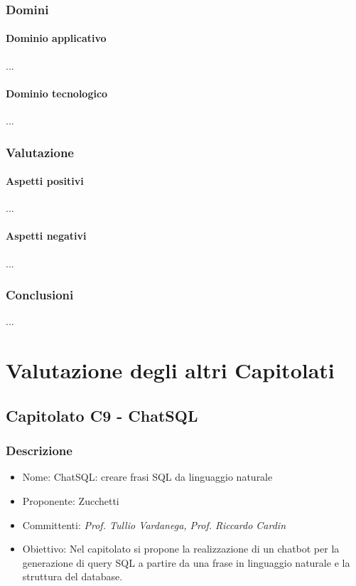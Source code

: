 \documentclass[italian,12pt]{article} %
\begin{document}
\subsubsection{Domini}
\paragraph{Dominio applicativo}
...
\paragraph{Dominio tecnologico}
...

\subsubsection{Valutazione}
\paragraph{Aspetti positivi}
...
\paragraph{Aspetti negativi}
...

\subsubsection{Conclusioni}
...



\section{Valutazione degli altri Capitolati}

\subsection{Capitolato C9 - ChatSQL}

\subsubsection{Descrizione}
\begin{itemize}
	\item Nome: ChatSQL: creare frasi SQL da linguaggio naturale
	\item Proponente: Zucchetti
	\item Committenti: {\it Prof. Tullio Vardanega, Prof. Riccardo Cardin}
	\item Obiettivo: Nel capitolato si propone la realizzazione di un chatbot per la generazione di query SQL a partire da una frase in linguaggio naturale e la struttura del database.
\end{itemize}
\end{document}
